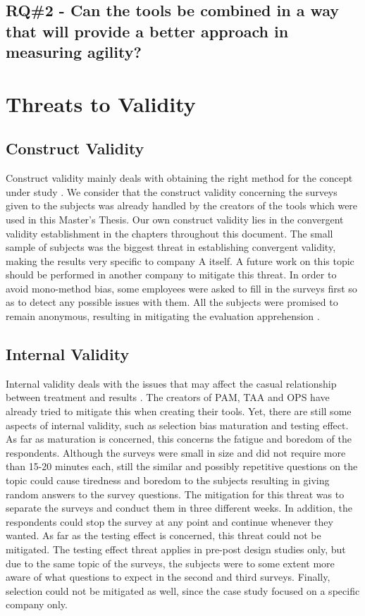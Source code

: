 
\subsection{RQ\#2 - Can the tools be combined in a way that will provide a better approach in measuring agility?}

\section{Threats to Validity}

\subsection{Construct Validity}
Construct validity mainly deals with obtaining the right method for the concept under study \cite{Wohlin}. We consider that the construct validity concerning the surveys given to the subjects was already handled by the creators of the tools which were used in this Master's Thesis. Our own construct validity lies in the convergent validity establishment in the chapters throughout this document. The small sample of subjects was the biggest threat in establishing convergent validity, making the results very specific to company A itself. A future work on this topic should be performed in another company to mitigate this threat. In order to avoid mono-method bias, some employees were asked to fill in the surveys first so as to detect any possible issues with them. All the subjects were promised to remain anonymous, resulting in mitigating the evaluation apprehension \cite{wohlin2012expse}. 

\subsection{Internal Validity}
Internal validity deals with the issues that may affect the casual relationship between treatment and results \cite{Wohlin}. The creators of \ac{PAM}, \ac{TAA} and \ac{OPS} have already tried to mitigate this when creating their tools. Yet, there are still some aspects of internal validity, such as selection bias maturation and testing effect. As far as maturation is concerned, this concerns the fatigue and boredom of the respondents. Although the surveys were small in size and did not require more than 15-20 minutes each, still the similar and possibly repetitive questions on the topic could cause tiredness and boredom to the subjects resulting in giving random answers to the survey questions. The mitigation for this threat was to separate the surveys and conduct them in three different weeks. In addition, the respondents could stop the survey at any point and continue whenever they wanted. As far as the testing effect is concerned, this threat could not be mitigated. The testing effect threat applies in pre-post design studies only, but due to the same topic of the surveys, the subjects were to some extent more aware of what questions to expect in the second and third surveys. Finally, selection could not be mitigated as well, since the case study focused on a specific company only.

